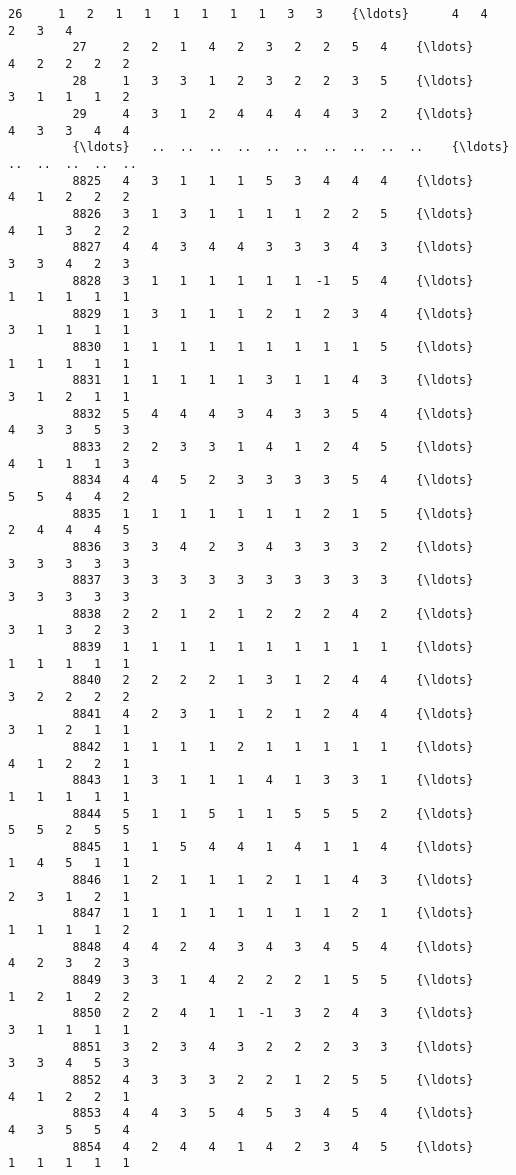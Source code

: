 \documentclass[11pt]{article}
\begin{document}
\begin{Verbatim}[commandchars=\\\{\}]
         26     1   2   1   1   1   1   1   1   3   3    {\ldots}      4   4   2   3   4   
         27     2   2   1   4   2   3   2   2   5   4    {\ldots}      4   2   2   2   2   
         28     1   3   3   1   2   3   2   2   3   5    {\ldots}      3   1   1   1   2   
         29     4   3   1   2   4   4   4   4   3   2    {\ldots}      4   3   3   4   4   
         {\ldots}   ..  ..  ..  ..  ..  ..  ..  ..  ..  ..    {\ldots}     ..  ..  ..  ..  ..   
         8825   4   3   1   1   1   5   3   4   4   4    {\ldots}      4   1   2   2   2   
         8826   3   1   3   1   1   1   1   2   2   5    {\ldots}      4   1   3   2   2   
         8827   4   4   3   4   4   3   3   3   4   3    {\ldots}      3   3   4   2   3   
         8828   3   1   1   1   1   1   1  -1   5   4    {\ldots}      1   1   1   1   1   
         8829   1   3   1   1   1   2   1   2   3   4    {\ldots}      3   1   1   1   1   
         8830   1   1   1   1   1   1   1   1   1   5    {\ldots}      1   1   1   1   1   
         8831   1   1   1   1   1   3   1   1   4   3    {\ldots}      3   1   2   1   1   
         8832   5   4   4   4   3   4   3   3   5   4    {\ldots}      4   3   3   5   3   
         8833   2   2   3   3   1   4   1   2   4   5    {\ldots}      4   1   1   1   3   
         8834   4   4   5   2   3   3   3   3   5   4    {\ldots}      5   5   4   4   2   
         8835   1   1   1   1   1   1   1   2   1   5    {\ldots}      2   4   4   4   5   
         8836   3   3   4   2   3   4   3   3   3   2    {\ldots}      3   3   3   3   3   
         8837   3   3   3   3   3   3   3   3   3   3    {\ldots}      3   3   3   3   3   
         8838   2   2   1   2   1   2   2   2   4   2    {\ldots}      3   1   3   2   3   
         8839   1   1   1   1   1   1   1   1   1   1    {\ldots}      1   1   1   1   1   
         8840   2   2   2   2   1   3   1   2   4   4    {\ldots}      3   2   2   2   2   
         8841   4   2   3   1   1   2   1   2   4   4    {\ldots}      3   1   2   1   1   
         8842   1   1   1   1   2   1   1   1   1   1    {\ldots}      4   1   2   2   1   
         8843   1   3   1   1   1   4   1   3   3   1    {\ldots}      1   1   1   1   1   
         8844   5   1   1   5   1   1   5   5   5   2    {\ldots}      5   5   2   5   5   
         8845   1   1   5   4   4   1   4   1   1   4    {\ldots}      1   4   5   1   1   
         8846   1   2   1   1   1   2   1   1   4   3    {\ldots}      2   3   1   2   1   
         8847   1   1   1   1   1   1   1   1   2   1    {\ldots}      1   1   1   1   2   
         8848   4   4   2   4   3   4   3   4   5   4    {\ldots}      4   2   3   2   3   
         8849   3   3   1   4   2   2   2   1   5   5    {\ldots}      1   2   1   2   2   
         8850   2   2   4   1   1  -1   3   2   4   3    {\ldots}      3   1   1   1   1   
         8851   3   2   3   4   3   2   2   2   3   3    {\ldots}      3   3   4   5   3   
         8852   4   3   3   3   2   2   1   2   5   5    {\ldots}      4   1   2   2   1   
         8853   4   4   3   5   4   5   3   4   5   4    {\ldots}      4   3   5   5   4   
         8854   4   2   4   4   1   4   2   3   4   5    {\ldots}      1   1   1   1   1   
         

\end{Verbatim}
\end{document}
